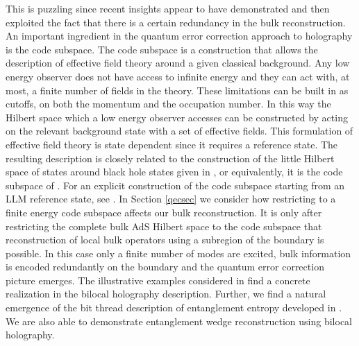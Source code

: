 \documentclass[a4paper,12pt]{article}
\begin{document}
This is puzzling since recent insights \cite{Almheiri:2014lwa,Pastawski:2015qua,Harlow:2016vwg} appear to have 
demonstrated and then exploited the fact that there is a certain redundancy in the bulk reconstruction.
An important ingredient in the quantum error correction approach to holography is the code subspace.
The code subspace is a construction that allows the description of effective field theory around a given classical background. 
Any low energy observer does not have access to infinite energy and they can act with, at most, a finite number of fields 
in the theory.
These limitations can be built in as cutoffs, on both the momentum and the occupation number.
In this way the Hilbert space which a low energy observer accesses can be constructed by acting on the relevant background 
state with a set of effective fields.
This formulation of effective field theory is state dependent \cite{Papadodimas:2013jku} since it requires a reference state. 
The resulting description is closely related to the construction of the little Hilbert space of states around black hole states given 
in \cite{Papadodimas:2012aq,Papadodimas:2013jku}, or equivalently, it is the code subspace of \cite{Almheiri:2014lwa}. 
For an explicit construction of the code subspace starting from an LLM reference state, see \cite{Berenstein:2017rrx}.
In Section \ref{qecsec} we consider how restricting to a finite energy code subspace affects our bulk reconstruction.
It is only after restricting the complete bulk AdS Hilbert space to the code subspace that reconstruction of local
bulk operators using a subregion of the boundary is possible.
In this case only a finite number of modes are excited, bulk information is encoded redundantly on the boundary and the
quantum error correction picture emerges.
The illustrative examples considered in \cite{Almheiri:2014lwa} find a concrete realization in the bilocal holography description.
Further, we find a natural emergence of the bit thread description of entanglement entropy developed in
\cite{Freedman:2016zud,Headrick:2017ucz,Cui:2018dyq}.
We are also able to demonstrate entanglement wedge reconstruction using bilocal holography.
\end{document}
